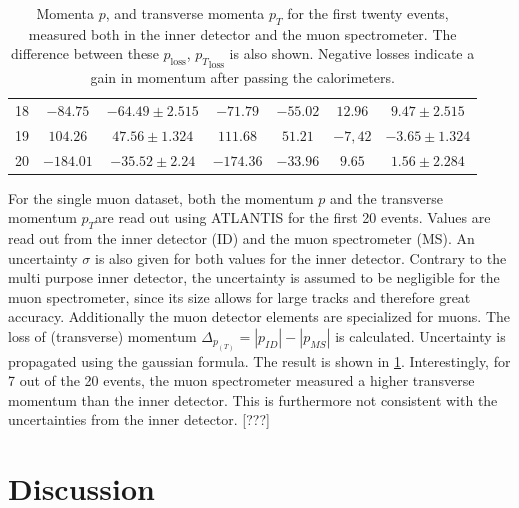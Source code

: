 \documentclass[twoside,        %
               BCOR12mm,       %
               ngerman,english, %
               fleqn,headsepline=false,footsepline=false
              ]{Vorlage/MFPREPORT}
\begin{document}
\begin{table}
\begin{tabular}{|c|c|c|c|c|c|c|}
  18&$-84.75$&$-64.49\pm 2.515$&$-71.79$&$-55.02$&$12.96$&$9.47\pm 2.515$\\
  19&$104.26$&$47.56\pm 1.324$&$111.68$&$51.21$&$-7,42$&$-3.65\pm 1.324$\\
  20&$-184.01$&$-35.52\pm 2.24$&$-174.36$&$-33.96$&$9.65$&$1.56\pm 2.284$\\
  \hline
  \end{tabular}
  \caption{Momenta $p$, and transverse momenta $p_T$ for the first twenty
  events, measured both in the inner detector and the muon spectrometer. The
  difference between these $p_\text{loss}$, ${p_T}_\text{loss}$ is also shown.
  Negative losses indicate a gain in momentum after passing the calorimeters.}
  \label{tab:loss}
\end{table}

For the single muon dataset, both the momentum $p$ and the transverse momentum
$p_T$are
read out using ATLANTIS for the first 20 events. Values are read out from the
inner detector (ID) and the muon spectrometer (MS). An uncertainty $\sigma$ is
also given for both values for the inner detector. Contrary to the multi
purpose inner detector, the uncertainty is assumed to be negligible for the
muon spectrometer, since its size allows for large tracks and therefore great
accuracy. Additionally the muon detector elements are specialized for muons.
The loss of (transverse) momentum $\Delta_{{p}_{(T)}}=|p_{ID}|-|p_{MS}|$ is
calculated. Uncertainty is propagated using the gaussian formula. The result is
shown in \cref{tab:loss}.
Interestingly, for 7 out of the 20 events, the muon spectrometer measured a
higher transverse momentum than the inner detector. This is furthermore not
consistent with the uncertainties from the inner detector. [???]








\section{Discussion}
\label{sec:discussion}



\newpage

\begin{appendices}
\end{appendices}
\end{document}
